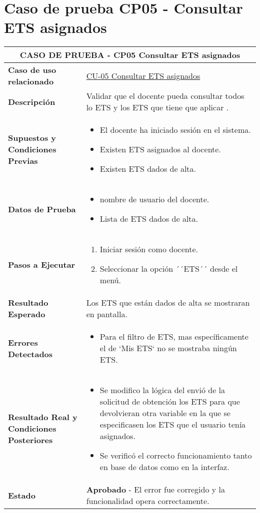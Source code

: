 \section{Caso de prueba CP05 - Consultar ETS asignados}

\begin{longtable}{|p{5cm}|p{10cm}|}
	\hline
	\multicolumn{2}{|c|}{\textbf{CASO DE PRUEBA - CP05 Consultar ETS asignados}} \\
	\hline
	\textbf{Caso de uso relacionado} & \hyperref[CU-05]{CU-05 Consultar ETS asignados} \\
	\hline
	\textbf{Descripción} & Validar que el docente pueda consultar todos lo ETS y los ETS que tiene que aplicar . \\
	\hline
	\textbf{Supuestos y Condiciones Previas} & 
	\begin{itemize}
		\item El docente ha iniciado sesión en el sistema.
		\item Existen ETS asignados al docente.
		\item Existen ETS dados de alta.
	\end{itemize} \\
	\hline
	\textbf{Datos de Prueba} & 
	\begin{itemize}
		\item nombre de usuario del docente.
		\item Lista de ETS dados de alta.
	\end{itemize} \\
	\hline
	\textbf{Pasos a Ejecutar} & 
	\begin{enumerate}
		\item Iniciar sesión como docente.
		\item Seleccionar la opción ´´ETS´´ desde el menú.
	\end{enumerate} \\
	\hline
	\textbf{Resultado Esperado} & 
	Los ETS que están dados de alta se mostraran en pantalla. \\
	\hline
	\textbf{Errores Detectados} & 
	\begin{itemize}
		\item Para el filtro de ETS, mas específicamente el de `Mis ETS` no se mostraba ningún ETS.

	\end{itemize} \\
	\hline
	\textbf{Resultado Real y Condiciones Posteriores} & 
	\begin{itemize}
		\item Se modifico la lógica del envió de la solicitud de obtención los ETS para que devolvieran otra variable en la que se especificasen los ETS que el usuario tenía asignados.
		\item Se verificó el correcto funcionamiento tanto en base de datos como en la interfaz.
	\end{itemize} \\
	\hline
	\textbf{Estado} & 
	\textbf{Aprobado} - El error fue corregido y la funcionalidad opera correctamente. \\
	\hline
\end{longtable}